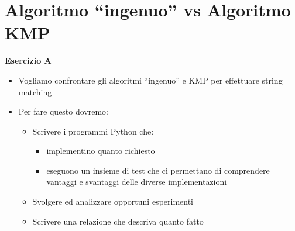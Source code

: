 \documentclass{article}
\begin{document}
\part{Algoritmo ``ingenuo'' vs Algoritmo KMP}

\begin{tcolorbox}[colback=lightgray!20,
                  colframe=black,
                  arc=3mm, auto outer arc,]
                  
    \textbf{Esercizio A}
    \begin{itemize}
    
    \item Vogliamo confrontare gli algoritmi ``ingenuo'' e KMP per effettuare string matching
    
    \item Per fare questo dovremo:
    
        \begin{itemize}
          
            \item Scrivere i programmi Python che:
          
            \begin{itemize}
            
                \item implementino quanto richiesto
                
                \item eseguono un insieme di test che ci permettano di comprendere vantaggi e svantaggi delle diverse implementazioni
                
            \end{itemize}
                
            \item Svolgere ed analizzare opportuni esperimenti
            
            \item Scrivere una relazione che descriva quanto fatto
            
        \end{itemize}
        
    \end{itemize}
\end{tcolorbox}
\end{document}
